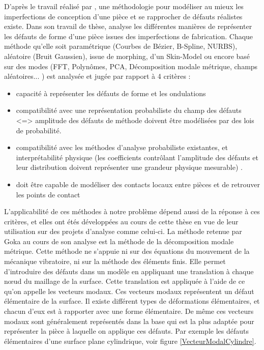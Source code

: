 \documentclass[a4paper,10pt]{article}
\begin{document}
D'après le travail réalisé par \cite{Goka2019Jun}, une méthodologie pour modéliser au mieux les imperfections de conception d'une pièce et se rapprocher de défauts réalistes existe. 
Dans son travail de thèse, \cite{Goka2019Jun} analyse les différentes manières de représenter les défauts de forme d'une pièce issues des imperfections de fabrication. Chaque méthode qu'elle soit paramétrique (Courbes de Bézier, B-Spline, NURBS), aléatoire (Bruit Gaussien), issue de morphing, d'un Skin-Model ou encore basé sur des modes (FFT, Polynômes, PCA, Décomposition modale métrique, champs aléatoires... ) est analysée et jugée par rapport à 4 critères : 
\begin{itemize}
	\item capacité à représenter les défauts de forme et les ondulations
	\item compatibilité avec une représentation probabiliste du champ des défauts <=> amplitude des défauts de méthode doivent être modélisées par des lois de probabilité.
	\item compatibilité avec les méthodes d'analyse probabiliste existantes, et interprétabilité physique (les coefficients contrôlant l'amplitude des défauts et leur distribution doivent représenter une grandeur physique mesurable) . 
	\item doit être capable de modéliser des contacts locaux entre pièces et de retrouver les points de contact 
\end{itemize}

L'applicabilité de ces méthodes à notre problème dépend aussi de la réponse à ces critères, et elles ont étés développées au cours de cette thèse en vue de leur utilisation sur des projets d'analyse comme celui-ci. 
La méthode retenue par Goka au cours de son analyse est la méthode de la décomposition modale métrique. 
Cette méthode ne s'appuie ni sur des équations du mouvement de la mécanique vibratoire, ni sur la méthode des éléments finis. Elle permet d'introduire des défauts dans un modèle en appliquant une translation à chaque nœud du maillage de la surface. Cette translation est appliquée à l'aide de ce qu'on appelle les vecteurs modaux. 
Ces vecteurs modaux représentent un défaut élémentaire de la surface. Il existe différent types de déformations élémentaires, et chacun d'eux est à rapporter avec une forme élémentaire. De même ces vecteurs modaux sont généralement représentés dans la base qui est la plus adaptée pour représenter la pièce à laquelle on applique ces défauts. Par exemple les défauts élémentaires d'une surface plane cylindrique, voir figure \ref{VecteurModalCylindre}. 
\end{document}
